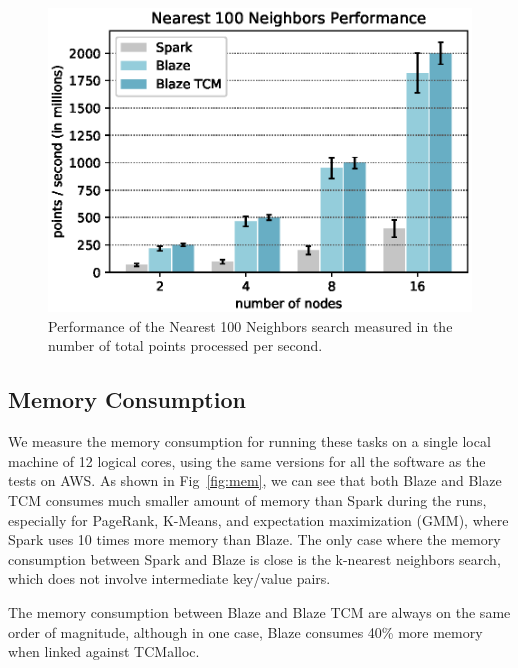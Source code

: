 \begin{figure}
  \begin{center}
  \includegraphics[width=0.7\linewidth]{figs/nn_speed.eps}
  \end{center}
  \vspace{-0.2cm}
  \caption{Performance of the Nearest 100 Neighbors search measured in the number of total points processed per second.
  }
  \label{fig:nn}
\end{figure}
\subsection{Memory Consumption}

We measure the memory consumption for running these tasks on a single local machine of 12 logical cores, using the same versions for all the software as the tests on AWS.
As shown in Fig~\ref{fig:mem}, we can see that both Blaze and Blaze TCM consumes much smaller amount of memory than Spark during the runs, especially for PageRank, K-Means, and expectation maximization (GMM), where Spark uses 10 times more memory than Blaze.
The only case where the memory consumption between Spark and Blaze is close is the k-nearest neighbors search, which does not involve intermediate key/value pairs.

The memory consumption between Blaze and Blaze TCM are always on the same order of magnitude, although in one case, Blaze consumes 40\% more memory when linked against TCMalloc.

